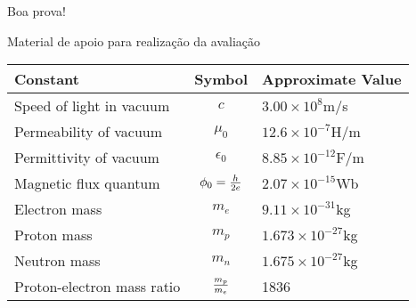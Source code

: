 \documentclass[11pt]{examdesign}
\begin{document}
\begin{examclosing}
\vfill
\begin{center}
\large Boa prova!
\end{center}
\end{examclosing}

\begin{endmatter}

\centerline
{\Large Material de apoio para realização da avaliação}
\bigskip
\bigskip

  \begin{center}
  \begin{tabular}{lcl}
    Constant & Symbol & Approximate Value \\ \hline
    Speed of light in vacuum & $c$ & $3.00 \times 10^8$m/s \\
    Permeability of vacuum & $\mu_0$ & $12.6 \times 10^{-7}$H/m \\
    Permittivity of vacuum & $\epsilon_0$ & $8.85 \times 10^{-12}$F/m \\
    Magnetic flux quantum & $\phi_0 = {h \over 2e}$ & $2.07 \times 10^{-15}$Wb \\
    Electron mass & $m_e$ & $9.11 \times 10^{-31}$kg \\
    Proton mass & $m_p$ & $1.673 \times 10^{-27}$kg \\
    Neutron mass & $m_n$ & $1.675 \times 10^{-27}$kg \\
    Proton-electron mass ratio & $m_p \over m_e$ & 1836
  \end{tabular}
  \end{center}
\end{endmatter}

 
\end{document}
